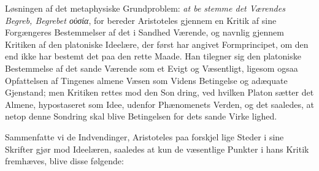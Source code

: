 \documentclass[12pt,a4paper]{book}
\newcommand{\gk}[1]{\textit{#1}}
\begin{document}
Løsningen af det metaphysiske Grundproblem: \emph{at be\-%
stemme det Værendes Begreb, Begrebet \gk{οὐσία}}, for\-%
bereder Aristoteles gjennem en Kritik af sine Forgængeres
Bestemmelser af det i Sandhed Værende, og navnlig gjennem
Kritiken af den platoniske Ideelære, der først har angivet
Formprincipet, om den end ikke har bestemt det paa den
rette Maade. Han tilegner sig den platoniske Bestemmelse af
det sande Værende som et Evigt og Væsentligt, ligesom ogsaa
Opfattelsen af Tingenes almene Væsen som Videns Betingelse
og adæquate Gjenstand; men Kritiken rettes mod den Son\-%
dring, ved hvilken Platon sætter det Almene, hypostaseret som
Idee, udenfor Phænomenets Verden, og det saaledes, at netop
denne Sondring skal blive Betingelsen for dets sande Virke\-%
lighed.

Sammenfatte vi de Indvendinger, Aristoteles paa forskjel\-%
lige Steder i sine Skrifter gjør mod Ideelæren, saaledes at kun
de væsentlige Punkter i hans Kritik fremhæves, blive disse
følgende:
\end{document}
